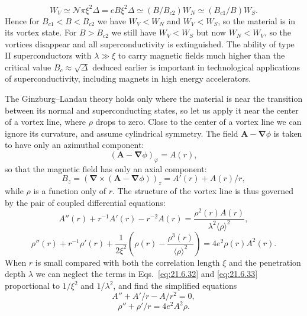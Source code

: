 \[
W_V\simeq\mathcal N\pi\xi^2\Delta
=eB\xi^2\Delta
\simeq(B/B_{c2})W_N
\simeq(B_{c1}/B)W_S.
\]
Hence for $B_{c1}<B<B_{c2}$ we have $W_V<W_N$ and $W_V<W_S$, so the material is in its vortex state. For $B>B_{c2}$ we still have $W_V<W_S$ but now $W_N<W_V$, so the vortices disappear and all superconductivity is extinguished. The ability of type II superconductors with $\lambda\gg\xi$ to carry magnetic fields much higher than the critical value $B_c\approx\sqrt\Delta$ deduced earlier is important in technological applications of superconductivity, including magnets in high energy accelerators.

The Ginzburg--Landau theory holds only where the material is near the transition between its normal and superconducting states, so let us apply it near the center of a vortex line, where $\rho$ drops to zero. Close to the center of a vortex line we can ignore its curvature, and assume cylindrical symmetry. The field $\mathbf A-\boldsymbol\nabla\phi$ is taken to have only an azimuthal component:
\begin{equation}
\left(\mathbf A-\boldsymbol\nabla\phi\right)_\varphi=A(r),
\tag{21.6.30}\label{eq:21.6.30}
\end{equation}
so that the magnetic field has only an axial component:
\begin{equation}
B_z=\left(
\boldsymbol\nabla\mathbin{\times}
(\mathbf A-\boldsymbol\nabla\phi)
\right)_z
=A'(r)+A(r)/r,
\tag{21.6.31}\label{eq:21.6.31}
\end{equation}
while $\rho$ is a function only of $r$. The structure of the vortex line is thus governed by the pair of coupled differential equations:
\begin{equation}
A''(r)+r^{-1}A'(r)-r^{-2}A(r)
=\frac{\rho^2(r)A(r)}{\lambda^2\langle\rho\rangle^2},
\tag{21.6.32}\label{eq:21.6.32}
\end{equation}
\begin{equation}
\rho''(r)+r^{-1}\rho'(r)
+\frac{1}{2\xi^2}
\left(\rho(r)-\frac{\rho^3(r)}{\langle\rho\rangle^2}\right)
=4e^2\rho(r)A^2(r).
\tag{21.6.33}\label{eq:21.6.33}
\end{equation}
When $r$ is small compared with both the correlation length $\xi$ and the penetration depth $\lambda$ we can neglect the terms in Eqs.~\eqref{eq:21.6.32} and \eqref{eq:21.6.33} proportional to $1/\xi^2$ and $1/\lambda^2$, and find the simplified equations
\begin{equation}
A''+A'/r-A/r^2=0,
\tag{21.6.34}\label{eq:21.6.34}
\end{equation}
\begin{equation}
\rho''+\rho'/r=4e^2A^2\rho.
\tag{21.6.35}\label{eq:21.6.35}
\end{equation}
